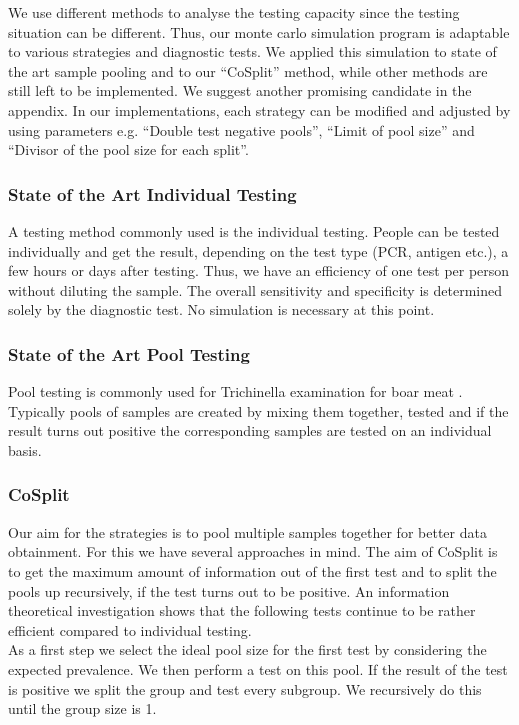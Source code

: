 \documentclass[fleqn,10pt]{wlscirep}
\begin{document}
	We use different methods to analyse the testing capacity since the testing situation can be different. Thus, our monte carlo simulation program is adaptable to various strategies and diagnostic tests. We applied this simulation to state of the art sample pooling and to our “CoSplit” method, while other methods are still left to be implemented. We suggest another promising candidate in the appendix. In our implementations, each strategy can be modified and adjusted by using parameters e.g. “Double test negative pools”, “Limit of pool size” and “Divisor of the pool size for each split”.
	
	
	\subsubsection{State of the Art Individual Testing}
	
	A testing method commonly used is the individual testing. People can be tested individually and get the result, depending on the test type (PCR, antigen etc.), a few hours or days after testing. Thus, we have an efficiency of one test per person without diluting the sample. The overall sensitivity and specificity is determined solely by the diagnostic test. No simulation is necessary at this point.
	
	
	\subsubsection{ State of the Art Pool Testing}
	
	Pool testing is commonly used for Trichinella examination for boar meat \cite{Trichinen}. Typically pools of samples are created by mixing them together, tested and if the result turns out positive the corresponding samples are tested on an individual basis. 
	
	\subsubsection{CoSplit}
	Our aim for the strategies is to pool multiple samples together for better data obtainment. For this we have several approaches in mind. The aim of CoSplit is to get the maximum amount of information out of the first test and to split the pools up recursively, if the test turns out to be positive. An information theoretical investigation shows that the following tests continue to be rather efficient compared to individual testing.\\
	
	As a first step we select the ideal pool size for the first test by considering the expected prevalence. We then perform a test on this pool. If the result of the test is positive we split the group and test every subgroup. We recursively do this until the group size is 1.\\
	
\end{document}
